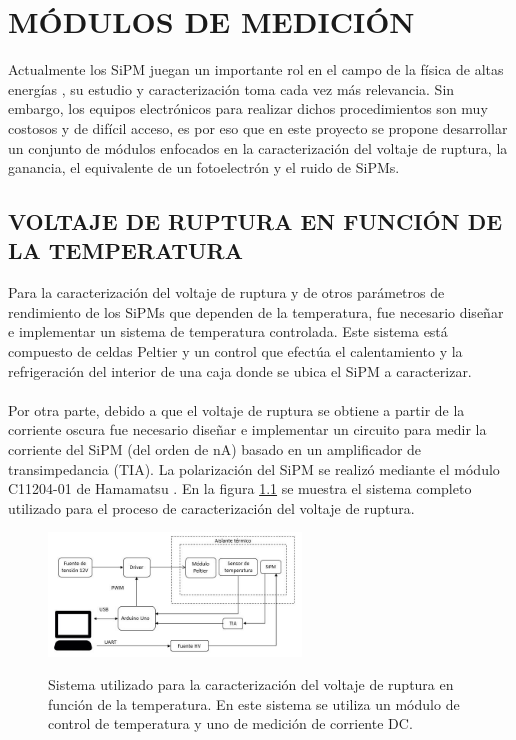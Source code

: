 \chapter{MÓDULOS DE MEDICIÓN}
\label{Cap:Modulos}
Actualmente los SiPM juegan un importante rol en el campo de la física de altas energías \citep{Intro_SIPM_Sensl}, su estudio y caracterización toma cada vez más relevancia. Sin embargo, los equipos electrónicos para realizar dichos procedimientos son muy costosos y de difícil acceso, es por eso que en este proyecto se propone desarrollar un conjunto de módulos enfocados en la caracterización del voltaje de ruptura, la ganancia, el equivalente de un fotoelectrón y el ruido de SiPMs.  
\section{VOLTAJE DE RUPTURA EN FUNCIÓN DE LA TEMPERATURA}
Para la caracterización del voltaje de ruptura y de otros parámetros de rendimiento de los SiPMs que dependen de la temperatura, fue necesario diseñar e implementar un sistema de temperatura controlada. Este sistema está compuesto de celdas Peltier y un control que efectúa el calentamiento y la refrigeración del interior de una caja donde se ubica el SiPM a caracterizar.\\ \\
Por otra parte, debido a que el  voltaje de ruptura se obtiene a partir de la corriente oscura fue necesario diseñar e  implementar un circuito para medir la corriente del SiPM (del orden de nA) basado en un amplificador de transimpedancia (TIA). La polarización del SiPM se realizó mediante el módulo C11204-01 de Hamamatsu \citep{Driver_mppc}. En la figura \ref{fig:complete_system} se muestra el sistema completo utilizado para el proceso de caracterización del voltaje de ruptura.
\begin{figure}[h!]
\begin{centering}
  \caption{Sistema utilizado para la caracterización del voltaje de ruptura en función de la temperatura. En este sistema se utiliza un módulo de control de temperatura y uno de medición de corriente DC.}
  \includegraphics[width=0.6\textwidth]{Images/Sistema_Completo_ruptura}
  \label{fig:complete_system}
  \par\end{centering}
\end{figure}

